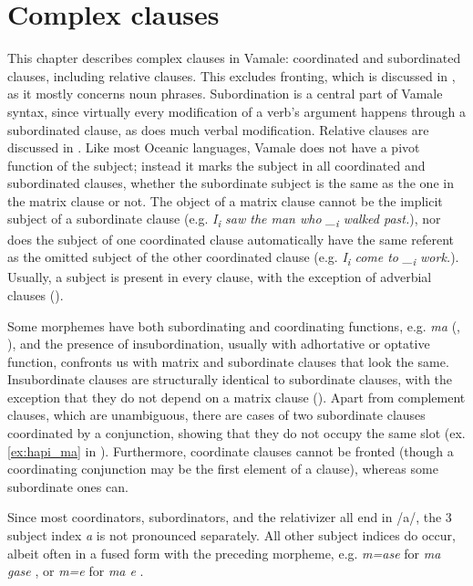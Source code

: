\chapter{Complex clauses} 
\label{ChapterSub} 
\begin{sloppypar}
This chapter describes complex clauses in Vamale: coordinated and subordinated clauses, including relative clauses. This excludes fronting, which is discussed in , as it mostly concerns noun phrases. Subordination is a central part of Vamale syntax, since virtually every modification of a verb's argument happens through a subordinated clause, as does much verbal modification. Relative clauses are discussed in . Like most Oceanic languages, Vamale does not have a pivot function of the subject; instead it marks the subject in all coordinated and subordinated clauses, whether the subordinate subject is the same as the one in the matrix clause or not. %
The object of a matrix clause cannot be the implicit subject of a subordinate clause (e.g. \textit{I\textsubscript{i} saw the man who \_\textsubscript{i} walked past.}), nor does the subject of one coordinated clause automatically have the same referent as the omitted subject of the other coordinated clause (e.g. \textit{I\textsubscript{i} come to \_\textsubscript{i} work.}). 
Usually, a subject is present in every clause, with the exception of adverbial clauses (). 
\end{sloppypar}

Some morphemes have both subordinating and coordinating functions, e.g. \textit{ma} (, ), and the presence of insubordination, usually with adhortative or optative function, confronts us with matrix and subordinate clauses that look the same. Insubordinate clauses are structurally identical to subordinate clauses, with the exception that they do not depend on a matrix clause (). Apart from complement clauses, which are unambiguous, there are cases of two subordinate clauses coordinated by a conjunction, showing that they do not occupy the same slot (ex. \ref{ex:hapi_ma} in ). Furthermore, coordinate clauses cannot be fronted (though a coordinating conjunction may be the first element of a clause), whereas some subordinate ones can. 

Since most coordinators, subordinators, and the relativizer all end in /a/, the 3 subject index \textit{a} is not pronounced separately. All other subject indices do occur, albeit often in a fused form with the preceding morpheme, e.g. \textit{m=ase} for \textit{ma gase} , or \textit{m=e} for \textit{ma e} . 

